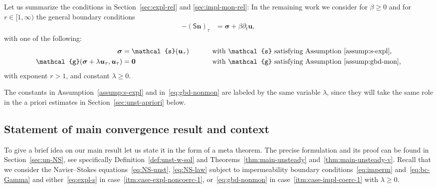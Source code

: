 \documentclass[reqno,a4paper]{amsart}
\def\tens#1{\pmb{\mathsf{#1}}}
\def\vec#1{\boldsymbol{#1}}
\def\b0{\vec{0}}
\def\bn{\vec{n}}
\def\bu{\vec{u}}
\def\bsigma{\vec{\sigma}}
\def\BS{\tens{S}}
\def\gbd{\vec{\mathcal{g}}}
\def\Srel{\vec{\mathcal{s}}}
\begin{document}
	Let us summarize the conditions in Section~\ref{sec:expl-rel} and \ref{sec:impl-mon-rel}: 
	In the remaining work we consider for $\beta\geq 0$ and for $r \in [1,\infty)$ the general boundary conditions 
	\begin{align}\label{eq:genbc}
		- (\BS \bn)_{\tau}  &= \bsigma %
		+ \beta \partial_t \bu,
	\end{align}
	with one of the following: 
	\begin{alignat}{2} 
		\label{itm:case-expl-noncoerc-1}
		\bsigma &= \Srel(\bu_\tau) \qquad &&
		\text{ with  $\Srel$ satisfying Assumption~\ref{assump:s-expl}, }
		\\			
		\label{itm:case-impl-coerc-1} 
		\gbd(\bsigma  + \lambda \bu_\tau, \bu_\tau)&= \b0 
		&&\text{ with $\gbd$ satisfying Assumption~\ref{assump:gbd-mon},} 
	\end{alignat}
	with exponent $r > 1$, and constant $\lambda \geq 0$.
	
	The constants in Assumption~\eqref{assump:s-expl} and in~\eqref{eq:gbd-nonmon} are labeled by the same variable $\lambda$, since they will take the same role in the a priori estimates in Section~\ref{sec:unst-apriori} below. 
	
	\subsection{Statement of main convergence result and context}\label{sec:main-results}
	
	To give a brief idea on our main result let us state it in the form of a meta theorem.  
	The precise formulation and its proof can be found in Section~\ref{sec:un-NS}, see specifically Definition~\ref{def:unst-w-sol} and Theorems~\ref{thm:main-unsteady} and~\ref{thm:main-unsteady-v}. 
	Recall that we consider the Navier--Stokes equations~\eqref{eq:NS-unst}, \eqref{eq:NS-law} subject to impermeability boundary conditions~\eqref{eq:imperm} and~\eqref{eq:bc-Gamma} and either~\eqref{eq:expl-s} in case~\eqref{itm:case-expl-noncoerc-1}, or~\eqref{eq:gbd-nonmon} in case~\eqref{itm:case-impl-coerc-1} with $\lambda \geq 0$. 
	
\end{document}
